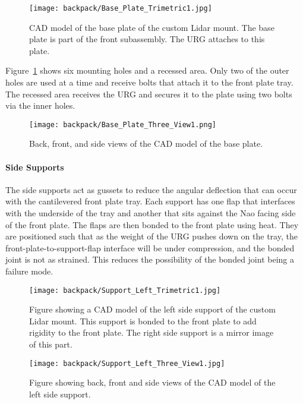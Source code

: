 \begin{figure}
\centering
\texttt{[image: backpack/Base\_Plate\_Trimetric1.jpg]}
\caption{CAD model of the base plate of the custom Lidar
         mount. The base plate is part of the front subassembly.
         The URG attaches to this plate.}
\label{fig:nao_lidar_mount_baseplate_trimetric1}
\end{figure}

Figure~\ref{fig:nao_lidar_mount_baseplate_trimetric1} shows six mounting holes
and a recessed area. Only two of the outer holes are used at a time and receive
bolts that attach it to the front plate tray. The recessed area receives the URG
and secures it to the plate using two bolts via the inner holes.

\begin{figure}
\centering
\texttt{[image: backpack/Base\_Plate\_Three\_View1.png]}
\caption{Back, front, and side views of the CAD model of the
         base plate.}
\label{fig:nao_lidar_mount_baseplate_three_view1}
\end{figure}


\paragraph{Side Supports}
The side supports act as gussets to reduce the angular deflection that can
occur with the cantilevered front plate tray. Each support has one flap
that interfaces with the underside of the tray and another that sits against
the Nao facing side of the front plate. The flaps are then bonded to the front
plate using heat. They are positioned such that as the weight of the URG pushes
down on the tray, the front-plate-to-support-flap interface will be under
compression, and the bonded joint is not as strained. This reduces the possibility
of the bonded joint being a failure mode.

\begin{figure}
\centering
\texttt{[image: backpack/Support\_Left\_Trimetric1.jpg]}
\caption{Figure showing a CAD model of the left side support of the custom
         Lidar mount. This support is bonded to the front plate to add rigidity
         to the front plate. The right side support is a mirror image of this
         part.}
\label{fig:nao_lidar_mount_supportleft_trimetric1}
\end{figure}

\begin{figure}
\centering
\texttt{[image: backpack/Support\_Left\_Three\_View1.jpg]}
\caption{Figure showing back, front and side views of the CAD model of the left
         side support.}
\label{fig:nao_lidar_mount_supportleft_three_view1}
\end{figure}

